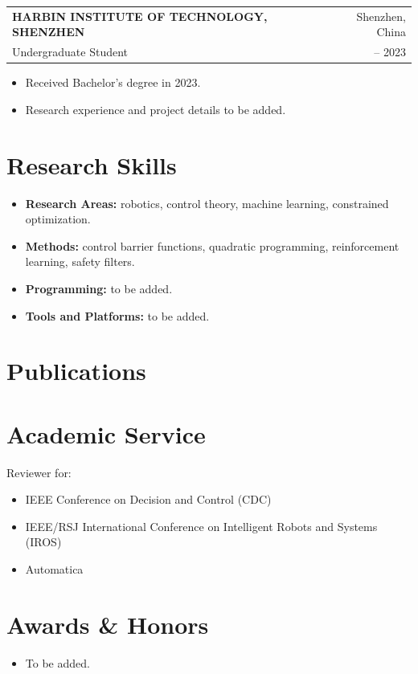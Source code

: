 \documentclass[10pt,letterpaper]{article}
\makeatletter
\newcommand{\entry}[4]{
  \begin{tabular*}{\textwidth}{@{}l@{\extracolsep{\fill}}r@{}}
    \textbf{\MakeUppercase{#1}} & #2 \\
    #3 & #4 \\
  \end{tabular*}
  \vspace{2pt}
}
\newcommand{\cvline}[1]{
  #1\par
  \vspace{2pt}
}
\newenvironment{cvitems}{
  \begin{itemize}[
    leftmargin=1.55em,
    itemsep=1pt,
    topsep=2pt,
    parsep=0pt,
    partopsep=0pt
  ]
}{
  \end{itemize}
}
\makeatother
\begin{document}
\entry
  {Harbin Institute of Technology, Shenzhen}
  {Shenzhen, China}
  {Undergraduate Student}
  {-- 2023}
\begin{cvitems}
  \item Received Bachelor's degree in 2023.
  \item Research experience and project details to be added.
\end{cvitems}

\section{Research Skills}

\begin{cvitems}
  \item \textbf{Research Areas:} robotics, control theory, machine learning, constrained optimization.
  \item \textbf{Methods:} control barrier functions, quadratic programming, reinforcement learning, safety filters.
  \item \textbf{Programming:} to be added.
  \item \textbf{Tools and Platforms:} to be added.
\end{cvitems}

\section{Publications}

\nocite{*}
\printbibliography[heading=none]

\section{Academic Service}

\cvline{Reviewer for:}
\begin{cvitems}
  \item IEEE Conference on Decision and Control (CDC)
  \item IEEE/RSJ International Conference on Intelligent Robots and Systems (IROS)
  \item Automatica
\end{cvitems}

\section{Awards \& Honors}

\begin{cvitems}
  \item To be added.
\end{cvitems}
\end{document}
